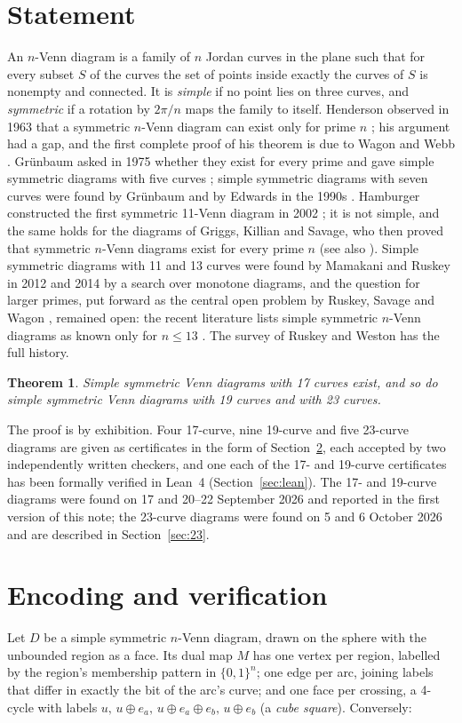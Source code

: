 \documentclass[11pt]{article}
\newtheorem{theorem}{Theorem}
\begin{document}
\section{Statement}
An $n$-Venn diagram is a family of $n$ Jordan curves in the plane such that for every subset $S$ of the curves the
set of points inside exactly the curves of $S$ is nonempty and connected. It is \emph{simple} if no point lies on
three curves, and \emph{symmetric} if a rotation by $2\pi/n$ maps the family to itself. Henderson observed in 1963
that a symmetric $n$-Venn diagram can exist only for prime $n$ \cite{Hen63}; his argument had a gap, and the first
complete proof of his theorem is due to Wagon and Webb \cite{WW08}. Gr\"unbaum asked in 1975 whether they
exist for every prime and gave simple symmetric diagrams with five curves \cite{Gru75}; simple symmetric diagrams with
seven curves were found by Gr\"unbaum and by Edwards in the 1990s \cite{Gru92,Edw98}. Hamburger constructed the first
symmetric 11-Venn diagram in 2002 \cite{Ham02}; it is not simple, and the same holds for the diagrams of Griggs,
Killian and Savage, who then proved that symmetric $n$-Venn diagrams exist for every prime $n$ \cite{GKS04} (see also
\cite{KRSW04}). Simple symmetric diagrams with 11 and 13 curves were found by Mamakani and Ruskey in 2012 and 2014
\cite{MR12,MR14} by a search over monotone diagrams, and the question for larger primes, put forward as the central open
problem by Ruskey, Savage and Wagon \cite{RSW06}, remained open: the recent literature lists simple symmetric $n$-Venn
diagrams as known only for $n\le 13$ \cite{BGMV26}. The survey of Ruskey and Weston \cite{RW97} has the full history.

\begin{theorem}
Simple symmetric Venn diagrams with 17 curves exist, and so do simple symmetric Venn diagrams with 19 curves and with
23 curves.
\end{theorem}

The proof is by exhibition. Four 17-curve, nine 19-curve and five 23-curve diagrams are given as certificates in the
form of Section~\ref{sec:encoding}, each accepted by two independently written checkers, and one each of the 17- and
19-curve certificates has been formally verified in Lean~4 (Section~\ref{sec:lean}). The 17- and 19-curve diagrams were
found on 17 and 20--22 September 2026 and reported in the first version of this note; the 23-curve diagrams were found
on 5 and 6 October 2026 and are described in Section~\ref{sec:23}.


\section{Encoding and verification}\label{sec:encoding}
Let $D$ be a simple symmetric $n$-Venn diagram, drawn on the sphere with the unbounded region as a face. Its dual
map $M$ has one vertex per region, labelled by the region's membership pattern in $\{0,1\}^n$; one edge per arc,
joining labels that differ in exactly the bit of the arc's curve; and one face per crossing, a 4-cycle with labels
$u,\,u{\oplus}e_a,\,u{\oplus}e_a{\oplus}e_b,\,u{\oplus}e_b$ (a \emph{cube square}). Conversely:
\end{document}
